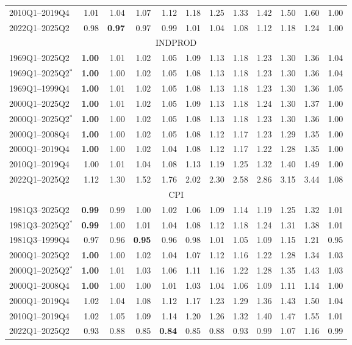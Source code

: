 \begin{tabular}{lrrrrrrrrrrr}
2010Q1--2019Q4 & 1.01 & 1.04 & 1.07 & 1.12 & 1.18 & 1.25 & 1.33 & 1.42 & 1.50 & 1.60 & 1.00 \\
2022Q1--2025Q2 & 0.98 & \textbf{0.97} & 0.97 & 0.99 & 1.01 & 1.04 & 1.08 & 1.12 & 1.18 & 1.24 & 1.00 \\
\hline
\multicolumn{12}{c}{INDPROD} \\
1969Q1--2025Q2 & \textbf{1.00} & 1.01 & 1.02 & 1.05 & 1.09 & 1.13 & 1.18 & 1.23 & 1.30 & 1.36 & 1.04 \\
1969Q1--2025Q2$^*$ & \textbf{1.00} & 1.00 & 1.02 & 1.05 & 1.08 & 1.13 & 1.18 & 1.23 & 1.30 & 1.36 & 1.04 \\
1969Q1--1999Q4 & \textbf{1.00} & 1.01 & 1.02 & 1.05 & 1.08 & 1.13 & 1.18 & 1.23 & 1.30 & 1.36 & 1.05 \\
2000Q1--2025Q2 & \textbf{1.00} & 1.01 & 1.02 & 1.05 & 1.09 & 1.13 & 1.18 & 1.24 & 1.30 & 1.37 & 1.00 \\
2000Q1--2025Q2$^*$ & \textbf{1.00} & 1.00 & 1.02 & 1.05 & 1.08 & 1.13 & 1.18 & 1.23 & 1.30 & 1.36 & 1.00 \\
2000Q1--2008Q4 & \textbf{1.00} & 1.00 & 1.02 & 1.05 & 1.08 & 1.12 & 1.17 & 1.23 & 1.29 & 1.35 & 1.00 \\
2000Q1--2019Q4 & \textbf{1.00} & 1.00 & 1.02 & 1.04 & 1.08 & 1.12 & 1.17 & 1.22 & 1.28 & 1.35 & 1.00 \\
2010Q1--2019Q4 & 1.00 & 1.01 & 1.04 & 1.08 & 1.13 & 1.19 & 1.25 & 1.32 & 1.40 & 1.49 & 1.00 \\
2022Q1--2025Q2 & 1.12 & 1.30 & 1.52 & 1.76 & 2.02 & 2.30 & 2.58 & 2.86 & 3.15 & 3.44 & 1.08 \\
\hline
\multicolumn{12}{c}{CPI} \\
1981Q3--2025Q2 & \textbf{0.99} & 0.99 & 1.00 & 1.02 & 1.06 & 1.09 & 1.14 & 1.19 & 1.25 & 1.32 & 1.01 \\
1981Q3--2025Q2$^*$ & \textbf{0.99} & 1.00 & 1.01 & 1.04 & 1.08 & 1.12 & 1.18 & 1.24 & 1.31 & 1.38 & 1.01 \\
1981Q3--1999Q4 & 0.97 & 0.96 & \textbf{0.95} & 0.96 & 0.98 & 1.01 & 1.05 & 1.09 & 1.15 & 1.21 & 0.95 \\
2000Q1--2025Q2 & \textbf{1.00} & 1.00 & 1.02 & 1.04 & 1.07 & 1.12 & 1.16 & 1.22 & 1.28 & 1.34 & 1.03 \\
2000Q1--2025Q2$^*$ & \textbf{1.00} & 1.01 & 1.03 & 1.06 & 1.11 & 1.16 & 1.22 & 1.28 & 1.35 & 1.43 & 1.03 \\
2000Q1--2008Q4 & \textbf{1.00} & 1.00 & 1.00 & 1.01 & 1.03 & 1.04 & 1.06 & 1.09 & 1.11 & 1.14 & 1.00 \\
2000Q1--2019Q4 & 1.02 & 1.04 & 1.08 & 1.12 & 1.17 & 1.23 & 1.29 & 1.36 & 1.43 & 1.50 & 1.04 \\
2010Q1--2019Q4 & 1.02 & 1.05 & 1.09 & 1.14 & 1.20 & 1.26 & 1.32 & 1.40 & 1.47 & 1.55 & 1.01 \\
2022Q1--2025Q2 & 0.93 & 0.88 & 0.85 & \textbf{0.84} & 0.85 & 0.88 & 0.93 & 0.99 & 1.07 & 1.16 & 0.99 \\
\hline
\end{tabular}

